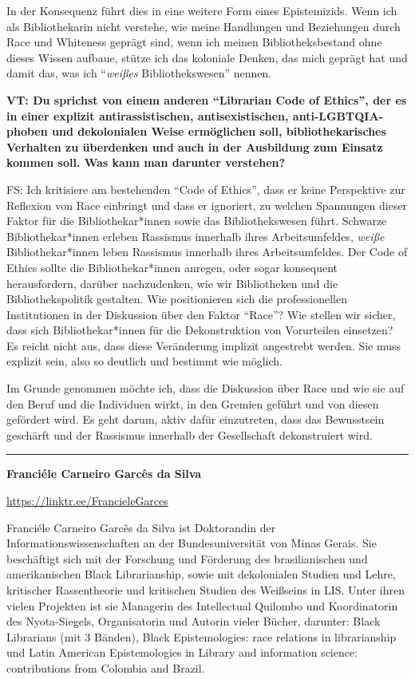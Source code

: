 \documentclass[a4paper,
fontsize=11pt,
oneside,
numbers=noperiodatend,
parskip=half-,
bibliography=totoc,
final
]{scrartcl}
\begin{document}
In der Konsequenz führt dies in eine weitere Form eines Epistemizids.
Wenn ich als Bibliothekarin nicht verstehe, wie meine Handlungen und
Beziehungen durch Race und Whiteness geprägt sind, wenn ich meinen
Bibliotheksbestand ohne dieses Wissen aufbaue, stütze ich das koloniale
Denken, das mich geprägt hat und damit das, was ich
\enquote{\emph{weißes} Bibliothekswesen} nennen.

\textbf{VT: Du sprichst von einem anderen \enquote{Librarian Code of
Ethics}, der es in einer explizit antirassistischen, antisexistischen,
anti-LGBTQIA-phoben und dekolonialen Weise ermöglichen soll,
bibliothekarisches Verhalten zu überdenken und auch in der Ausbildung
zum Einsatz kommen soll. Was kann man darunter verstehen?}

FS: Ich kritisiere am bestehenden \enquote{Code of Ethics}, dass er
keine Perspektive zur Reflexion von Race einbringt und dass er
ignoriert, zu welchen Spannungen dieser Faktor für die
Bibliothekar*innen sowie das Bibliothekswesen führt. Schwarze
Bibliothekar*innen erleben Rassismus innerhalb ihres Arbeitsumfeldes,
\emph{weiße} Bibliothekar*innen leben Rassismus innerhalb ihres
Arbeitsumfeldes. Der Code of Ethics sollte die Bibliothekar*innen
anregen, oder sogar konsequent herausfordern, darüber nachzudenken, wie
wir Bibliotheken und die Bibliothekspolitik gestalten. Wie positionieren
sich die professionellen Institutionen in der Diskussion über den Faktor
\enquote{Race}? Wie stellen wir sicher, dass sich Bibliothekar*innen für
die Dekonstruktion von Vorurteilen einsetzen? Es reicht nicht aus, dass
diese Veränderung implizit angestrebt werden. Sie muss explizit sein,
also so deutlich und bestimmt wie möglich.

Im Grunde genommen möchte ich, dass die Diskussion über Race und wie sie
auf den Beruf und die Individuen wirkt, in den Gremien geführt und von
diesen gefördert wird. Es geht darum, aktiv dafür einzutreten, dass das
Bewusstsein geschärft und der Rassismus innerhalb der Gesellschaft
dekonstruiert wird.

\begin{center}\rule{0.5\linewidth}{0.5pt}\end{center}

\textbf{Franciéle Carneiro Garcês da Silva}

\url{https://linktr.ee/FrancieleGarces}

Franciéle Carneiro Garcês da Silva ist Doktorandin der
Informationswissenschaften an der Bundesuniversität von Minas Gerais.
Sie beschäftigt sich mit der Forschung und Förderung des brasilianischen
und amerikanischen Black Librarianship, sowie mit dekolonialen Studien
und Lehre, kritischer Rassentheorie und kritischen Studien des Weißseins
in LIS. Unter ihren vielen Projekten ist sie Managerin des Intellectual
Quilombo und Koordinatorin des Nyota-Siegels, Organisatorin und Autorin
vieler Bücher, darunter: Black Librarians (mit 3 Bänden), Black
Epistemologies: race relations in librarianship und Latin American
Epistemologies in Library and information science: contributions from
Colombia and Brazil.
\end{document}

